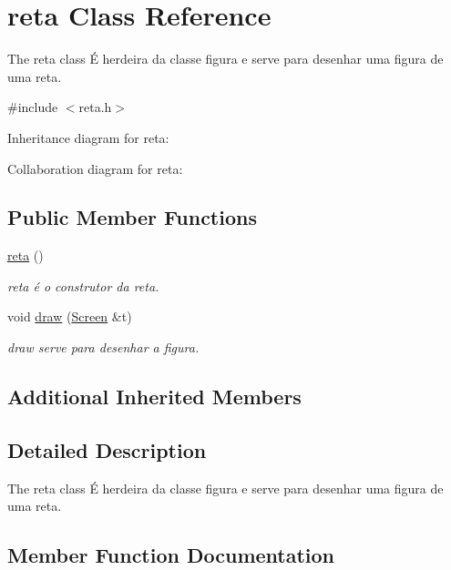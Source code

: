 \hypertarget{classreta}{}\section{reta Class Reference}
\label{classreta}


The reta class É herdeira da classe figura e serve para desenhar uma figura de uma reta.  




{\ttfamily \#include $<$reta.\+h$>$}



Inheritance diagram for reta\+:


Collaboration diagram for reta\+:
\subsection*{Public Member Functions}
\begin{DoxyCompactItemize}
\item 
\hyperlink{classreta_a29b14d7f5cbfbf6c69218ecd58550040}{reta} ()\hypertarget{classreta_a29b14d7f5cbfbf6c69218ecd58550040}{}\label{classreta_a29b14d7f5cbfbf6c69218ecd58550040}

\begin{DoxyCompactList}\small\item\em reta é o construtor da reta. \end{DoxyCompactList}\item 
void \hyperlink{classreta_ae3df392441aa1e3cba42de1e4b7c8beb}{draw} (\hyperlink{classScreen}{Screen} \&t)
\begin{DoxyCompactList}\small\item\em draw serve para desenhar a figura. \end{DoxyCompactList}\end{DoxyCompactItemize}
\subsection*{Additional Inherited Members}


\subsection{Detailed Description}
The reta class É herdeira da classe figura e serve para desenhar uma figura de uma reta. 

\subsection{Member Function Documentation}
